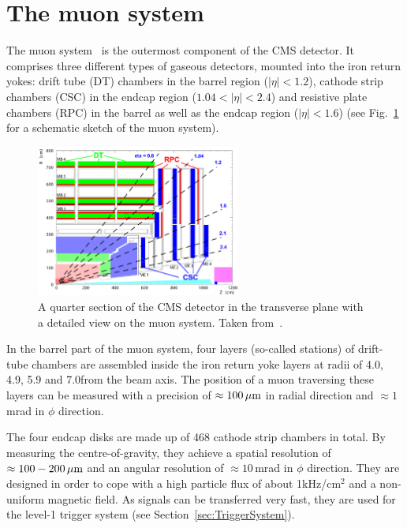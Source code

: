 \section{The muon system}
\label{sec:MuonSystem}
The muon system~\cite{bib:CMS:TDR_2006,bib:CMS:TDR_MuonSystem} is the outermost component of the CMS detector.
It comprises three different types of gaseous detectors, mounted into the iron return yokes: drift tube (DT) chambers in the barrel region ($|\eta|<1.2$), cathode strip chambers (CSC) in the endcap region ($1.04<|\eta|<2.4$) and resistive plate chambers (RPC) in the barrel as well as the endcap region ($|\eta|<1.6$) (see Fig.~\ref{fig:MuonSystem} for a schematic sketch of the muon system).
\begin{figure}[!b]
  \centering
      \includegraphics[width=0.60\textwidth]{figures/experiment/CMS/Figures_Experimental_Apparatus_MuonDetector.png}
  \caption{A quarter section of the CMS detector in the transverse plane with a detailed view on the muon system. Taken from~\cite{bib:CMS:TDR_2006}.}  
  \label{fig:MuonSystem}
\end{figure}
In the barrel part of the muon system, four layers (so-called stations) of drift-tube chambers are assembled inside the iron return yoke layers at radii of 4.0, 4.9, 5.9 and 7.0\m from the beam axis.
The position of a muon traversing these layers can be measured with a precision of $\approx 100\,\mu\text{m}$ in radial direction and $\approx 1\,$mrad in $\phi$ direction. 

The four endcap disks are made up of 468 cathode strip chambers in total.
By measuring the centre-of-gravity, they achieve a spatial resolution of $\approx 100-200\,\mu\text{m}$ and an angular resolution of $\approx 10\,$mrad in $\phi$ direction.
They are designed in order to cope with a high particle flux of about 1kHz/cm$^2$ and a non-uniform magnetic field.
As signals can be transferred very fast, they are used for the level-1 trigger system (see Section~\ref{sec:TriggerSystem}).

